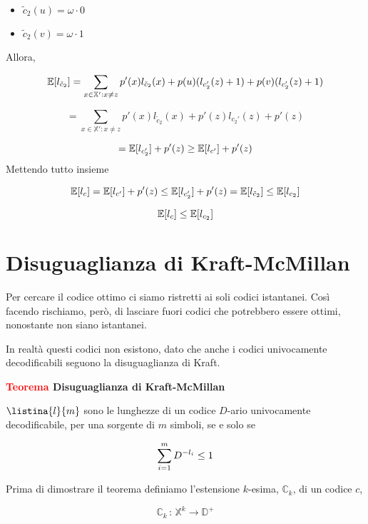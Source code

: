 \documentclass[12pt]{report}
\begin{document}
    \begin{itemize}
        \item $\tilde c_2 (u) = \omega \cdot 0$
        \item $\tilde c_2 (v) = \omega \cdot 1$
    \end{itemize}
    Allora,

    $$\mathbb{E}[l_{\tilde c_2}] = \sum_{x \in \mathbb{X}': x \neq z} p'(x) l_{\tilde c_2}(x) + p(u) (l_{c_2'} (z) + 1) + p(v) (l_{ c_2'}(z) +1)$$

    $$= \sum_{x \in \mathbb{X}': x \neq z} p'(x) l_{\tilde c_2}(x) + p'(z) l_{c_2'}(z) + p'(z)$$

    $$= \mathbb{E}[l_{c_2'}] + p'(z) \geq \mathbb{E}[l_{c'}] + p'(z)$$
    Mettendo tutto insieme

    $$\mathbb{E}[l_c] = \mathbb{E}[l_{c'}] + p'(z) \leq \mathbb{E} [l_{c_2'}] + p'(z)  = \mathbb{E}[l_{\tilde c_2}] \leq \mathbb{E}[l_{c_2}]$$

    $$\mathbb{E}[l_c] \leq  \mathbb{E}[l_{c_2}] $$

    \section{Disuguaglianza di Kraft-McMillan}
    Per cercare il codice ottimo ci siamo ristretti ai soli codici istantanei. Così facendo rischiamo, però, di lasciare fuori codici che potrebbero essere ottimi, nonostante non siano istantanei.

    In realtà questi codici non esistono, dato che anche i codici univocamente decodificabili seguono la disuguaglianza di Kraft.

    \vspace{5px}
    \begin{tcolorbox}
        \textbf{\textcolor{red}{Teorema} Disuguaglianza di Kraft-McMillan }
        \vspace{5px}
        \begin{center}

            $\listina{l}{m}$ sono le lunghezze di un codice $D$-ario univocamente decodificabile, per una sorgente di $m$ simboli, se e solo se

            $$\sum_{i=1}^{m} D^{-l_i} \leq 1$$

        \end{center}
    \end{tcolorbox}
    Prima di dimostrare il teorema definiamo l'estensione $k$-esima, $\mathbb{C}_k$, di un codice $c$,

    $$\mathbb{C}_k \, : \, \mathbb{X}^k \rightarrow \mathbb{D}^+$$
\end{document}
